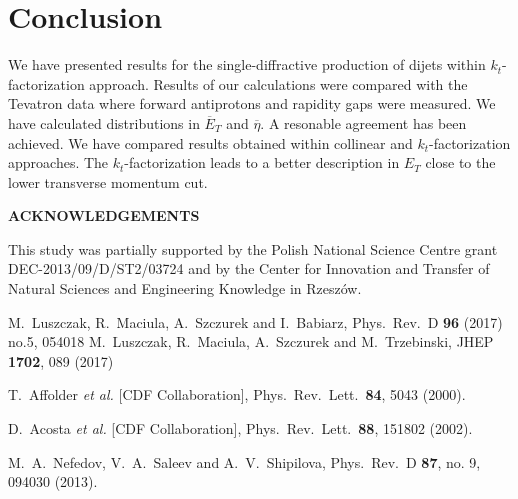 \documentclass[12pt]{article}
\def\Acknowledgements{\bigskip  \bigskip \begin{center} \begin{large}
             \bf ACKNOWLEDGEMENTS \end{large}\end{center}}
\begin{document}
\section{Conclusion}
We have presented results for
the single-diffractive production of dijets within $k_t$-factorization
approach. Results of our calculations were compared with the Tevatron data 
where forward antiprotons and rapidity gaps were measured. We have 
calculated distributions in ${\overline{E}_T}$ and ${\overline \eta}$. 
A resonable agreement has been achieved.
We have compared results obtained within collinear and 
$k_t$-factorization approaches.
The $k_t$-factorization leads to a better description in 
$E_T$ close to the lower transverse momentum cut.
\Acknowledgements
This study was partially supported by the Polish National Science Centre grant DEC-2013/09/D/ST2/03724 and by the Center for Innovation and Transfer of
Natural Sciences and Engineering Knowledge in Rzesz\'ow.


\begin{thebibliography}{99}

  M.~Luszczak, R.~Maciula, A.~Szczurek and I.~Babiarz,
  Phys.\ Rev.\ D {\bf 96} (2017) no.5, 054018
  M.~Luszczak, R.~Maciula, A.~Szczurek and M.~Trzebinski,
  JHEP {\bf 1702}, 089 (2017)

  T.~Affolder {\it et al.} [CDF Collaboration],
  Phys.\ Rev.\ Lett.\  {\bf 84}, 5043 (2000).

  D.~Acosta {\it et al.} [CDF Collaboration],
  Phys.\ Rev.\ Lett.\  {\bf 88}, 151802 (2002).

  M.~A.~Nefedov, V.~A.~Saleev and A.~V.~Shipilova,
  Phys.\ Rev.\ D {\bf 87}, no. 9, 094030 (2013).






\end{thebibliography}

 
\end{document}
